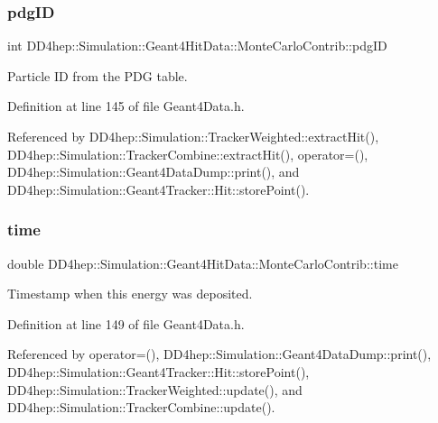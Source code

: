 \subsubsection{\texorpdfstring{pdg\+ID}{pdgID}}
{\footnotesize\ttfamily int D\+D4hep\+::\+Simulation\+::\+Geant4\+Hit\+Data\+::\+Monte\+Carlo\+Contrib\+::pdg\+ID}



Particle ID from the P\+DG table. 



Definition at line 145 of file Geant4\+Data.\+h.



Referenced by D\+D4hep\+::\+Simulation\+::\+Tracker\+Weighted\+::extract\+Hit(), D\+D4hep\+::\+Simulation\+::\+Tracker\+Combine\+::extract\+Hit(), operator=(), D\+D4hep\+::\+Simulation\+::\+Geant4\+Data\+Dump\+::print(), and D\+D4hep\+::\+Simulation\+::\+Geant4\+Tracker\+::\+Hit\+::store\+Point().

\hypertarget{class_d_d4hep_1_1_simulation_1_1_geant4_hit_data_1_1_monte_carlo_contrib_a2d1cbbdb9da1af65acb58ef97fe10277}{}\label{class_d_d4hep_1_1_simulation_1_1_geant4_hit_data_1_1_monte_carlo_contrib_a2d1cbbdb9da1af65acb58ef97fe10277} 
\subsubsection{\texorpdfstring{time}{time}}
{\footnotesize\ttfamily double D\+D4hep\+::\+Simulation\+::\+Geant4\+Hit\+Data\+::\+Monte\+Carlo\+Contrib\+::time}



Timestamp when this energy was deposited. 



Definition at line 149 of file Geant4\+Data.\+h.



Referenced by operator=(), D\+D4hep\+::\+Simulation\+::\+Geant4\+Data\+Dump\+::print(), D\+D4hep\+::\+Simulation\+::\+Geant4\+Tracker\+::\+Hit\+::store\+Point(), D\+D4hep\+::\+Simulation\+::\+Tracker\+Weighted\+::update(), and D\+D4hep\+::\+Simulation\+::\+Tracker\+Combine\+::update().

\hypertarget{class_d_d4hep_1_1_simulation_1_1_geant4_hit_data_1_1_monte_carlo_contrib_a80a8546851d931b3b39e690a3bc1b3d8}{}\label{class_d_d4hep_1_1_simulation_1_1_geant4_hit_data_1_1_monte_carlo_contrib_a80a8546851d931b3b39e690a3bc1b3d8} 
